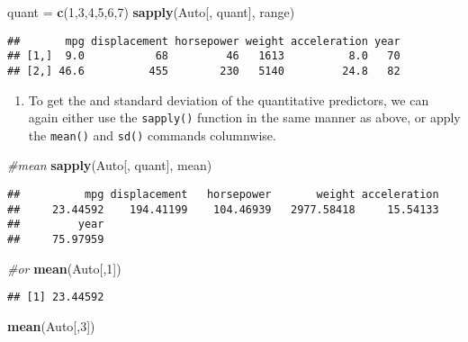 \documentclass[]{article}
\newenvironment{Shaded}{\begin{snugshade}}{\end{snugshade}}
\newcommand{\CommentTok}[1]{\textcolor[rgb]{0.56,0.35,0.01}{\textit{#1}}}
\newcommand{\DecValTok}[1]{\textcolor[rgb]{0.00,0.00,0.81}{#1}}
\newcommand{\KeywordTok}[1]{\textcolor[rgb]{0.13,0.29,0.53}{\textbf{#1}}}
\newcommand{\NormalTok}[1]{#1}
\newcommand{\StringTok}[1]{\textcolor[rgb]{0.31,0.60,0.02}{#1}}
\providecommand{\tightlist}{%
  \setlength{\itemsep}{0pt}\setlength{\parskip}{0pt}}
\begin{document}
\begin{Shaded}
\begin{Highlighting}[]
\NormalTok{quant =}\StringTok{ }\KeywordTok{c}\NormalTok{(}\DecValTok{1}\NormalTok{,}\DecValTok{3}\NormalTok{,}\DecValTok{4}\NormalTok{,}\DecValTok{5}\NormalTok{,}\DecValTok{6}\NormalTok{,}\DecValTok{7}\NormalTok{)}
\KeywordTok{sapply}\NormalTok{(Auto[, quant], range)}
\end{Highlighting}
\end{Shaded}

\begin{verbatim}
##       mpg displacement horsepower weight acceleration year
## [1,]  9.0           68         46   1613          8.0   70
## [2,] 46.6          455        230   5140         24.8   82
\end{verbatim}

\begin{enumerate}
\def\labelenumi{\alph{enumi})}
\setcounter{enumi}{2}
\tightlist
\item
  To get the and standard deviation of the quantitative predictors, we
  can again either use the \texttt{sapply()} function in the same manner
  as above, or apply the \texttt{mean()} and \texttt{sd()} commands
  columnwise.
\end{enumerate}

\begin{Shaded}
\begin{Highlighting}[]
\CommentTok{#mean}
\KeywordTok{sapply}\NormalTok{(Auto[, quant], mean)}
\end{Highlighting}
\end{Shaded}

\begin{verbatim}
##          mpg displacement   horsepower       weight acceleration 
##     23.44592    194.41199    104.46939   2977.58418     15.54133 
##         year 
##     75.97959
\end{verbatim}

\begin{Shaded}
\begin{Highlighting}[]
\CommentTok{#or}
\KeywordTok{mean}\NormalTok{(Auto[,}\DecValTok{1}\NormalTok{])}
\end{Highlighting}
\end{Shaded}

\begin{verbatim}
## [1] 23.44592
\end{verbatim}

\begin{Shaded}
\begin{Highlighting}[]
\KeywordTok{mean}\NormalTok{(Auto[,}\DecValTok{3}\NormalTok{])}
\end{Highlighting}
\end{Shaded}
\end{document}
